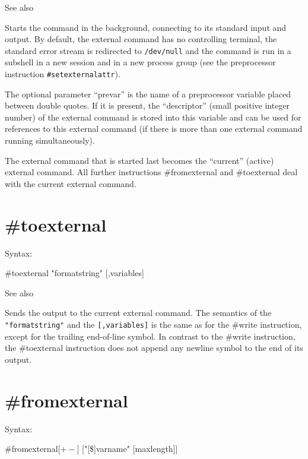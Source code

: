 \noindent See also

\noindent Starts the command in the background, 
connecting to its standard input and output. By default, the external 
command has no controlling terminal, the standard error stream is 
redirected to \verb|/dev/null| and the command is run in a subshell in a 
new session and in a new process group (see the preprocessor instruction 
\verb|#setexternalattr|).

The optional parameter ``prevar'' is the name of a preprocessor variable 
placed between double quotes. If it is present, the ``descriptor'' (small 
positive integer number) of the external command is stored into this 
variable and can be used for references to this external command (if there 
is more than one external command running simultaneously).

The external command that is started last becomes the ``current'' (active) 
external command.  All further instructions 
\#fromexternal and \#toexternal 
deal with the current external command.


\section{\#toexternal}
\label{toexternalcommunication}

\noindent Syntax:

\#toexternal "formatstring" [,variables]

\noindent See also

\noindent Sends the output to the current 
external command. The semantics of the 
\verb|"formatstring"| and the \verb|[,variables]| is the same as for the 
\#write instruction, except for the trailing end-of-line symbol. In 
contrast to the \#write instruction, the \#toexternal instruction does not 
append any newline symbol to the end of its output.


\section{\#fromexternal}
\label{fromexternalcommunication}

\noindent Syntax:

\#fromexternal[$+-$] ["[\$]varname" [maxlength]]

